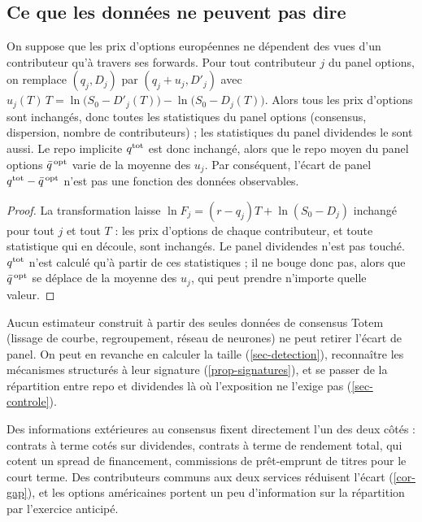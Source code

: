 \subsection{Ce que les données ne peuvent pas dire}\label{sec-nonid}
\begin{theorem}\label{thm-nonid}
On suppose que les prix d'options européennes ne dépendent des vues d'un contributeur qu'à travers ses forwards.
Pour tout contributeur $j$ du panel options, on remplace $(q_j, D_j)$ par $(q_j+u_j, D'_j)$ avec
$u_j(T)\,T=\ln\bigl(S_0-D'_j(T)\bigr)-\ln\bigl(S_0-D_j(T)\bigr)$. Alors tous les prix d'options sont inchangés, donc
toutes les statistiques du panel options (consensus, dispersion, nombre de contributeurs) ; les statistiques du panel
dividendes le sont aussi. Le repo implicite $q^{\mathrm{tot}}$ est donc inchangé, alors que le repo moyen du panel options
$\bar q^{\,\mathrm{opt}}$ varie de la moyenne des $u_j$. Par conséquent, l'écart de panel $q^{\mathrm{tot}}-\bar q^{\,\mathrm{opt}}$ n'est pas une fonction des
données observables.
\end{theorem}
\begin{proof}
La transformation laisse $\ln F_j=(r-q_j)T+\ln(S_0-D_j)$ inchangé pour tout $j$ et tout $T$ : les prix d'options de
chaque contributeur, et toute statistique qui en découle, sont inchangés. Le panel dividendes n'est pas touché.
$q^{\mathrm{tot}}$ n'est calculé qu'à partir de ces statistiques ; il ne bouge donc pas, alors que $\bar q^{\,\mathrm{opt}}$ se déplace de la
moyenne des $u_j$, qui peut prendre n'importe quelle valeur.
\end{proof}

\begin{corollary}\label{cor-nonid}
Aucun estimateur construit à partir des seules données de consensus Totem (lissage de courbe, regroupement, réseau
de neurones) ne peut retirer l'écart de panel. On peut en revanche en calculer la taille (\cref{sec-detection}),
reconnaître les mécanismes structurés à leur signature (\cref{prop-signatures}), et se passer de la répartition
entre repo et dividendes là où l'exposition ne l'exige pas (\cref{sec-controle}).
\end{corollary}

\begin{remark}
Des informations extérieures au consensus fixent directement l'un des deux côtés : contrats à terme cotés sur
dividendes, contrats à terme de rendement total, qui cotent un spread de financement, commissions de prêt-emprunt de
titres pour le court terme. Des contributeurs communs aux deux services réduisent l'écart (\cref{cor-gap}), et les
options américaines portent un peu d'information sur la répartition par l'exercice anticipé.
\end{remark}

